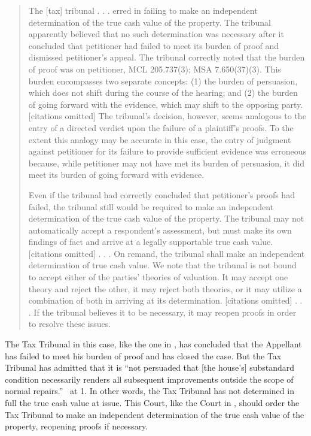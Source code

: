 \documentclass[12pt,\documentclassflag]{michiganCourtOfAppealsBrief}
\begin{document}
{\begin{quote}
The [tax] tribunal . . . erred in failing to make an independent determination of the true cash value of the property. The tribunal apparently believed that no such determination was necessary after it concluded that petitioner had failed to meet its burden of proof and dismissed petitioner's appeal. The tribunal correctly noted that the burden of proof was on petitioner, MCL 205.737(3); MSA 7.650(37)(3). This burden encompasses two separate concepts: (1) the burden of persuasion, which does not shift during the course of the hearing; and (2) the burden of going forward with the evidence, which may shift to the opposing party. [citations omitted] The tribunal's decision, however, seems analogous to the entry of a directed verdict upon the failure of a plaintiff's proofs. To the extent this analogy may be accurate in this case, the entry of judgment against petitioner for its failure to provide sufficient evidence was erroneous because, while petitioner may not have met its burden of persuasion, it did meet its burden of going forward with evidence.

  Even if the tribunal had correctly concluded that petitioner's proofs had failed, the tribunal still would be required to make an independent determination of the true cash value of the property. The tribunal may not automatically accept a respondent's assessment, but must make its own findings of fact and arrive at a legally supportable true cash value. [citations omitted] . . . On remand, the tribunal shall make an independent determination of true cash value. We note that the tribunal is not bound to accept either of the parties' theories of valuation. It may accept one theory and reject the other, it may reject both theories, or it may utilize a combination of both in arriving at its determination. [citations omitted] . . . If the tribunal believes it to be necessary, it may reopen proofs in order to resolve these issues.
\end{quote}

The Tax Tribunal in this case, like the one in \cite[s]{Jones & Laughlin}, has concluded that the Appellant has failed to meet his burden of proof and has closed the case.  But the Tax Tribunal has admitted that it is ``not persuaded that [the house's] substandard condition necessarily renders all subsequent improvements outside the scope of normal repairs.'' \FOJ\ at 1. In other words, the Tax Tribunal has not determined in full the true cash value at issue. This Court, like the Court in \cite[s]{Jones & Laughlin}, should order the Tax Tribunal to make an independent determination of the true cash value of the property, reopening proofs if necessary.

}
\end{document}
